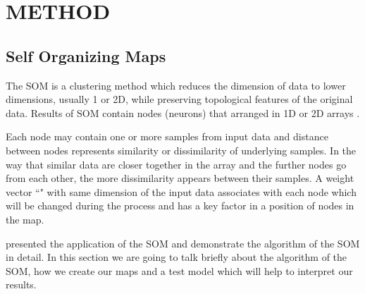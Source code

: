 
\section{METHOD}
\label{sec: method}
 \subsection{Self Organizing Maps}
 \label{sec: som}
 
 The SOM is a clustering method which reduces the dimension of data to lower dimensions, usually 1 or 2D, while preserving topological features of the original data.
 Results of SOM contain nodes (neurons) that arranged in 1D or 2D arrays \citep{Kohonen98}. 
 
 Each node may contain one or more samples from input data and distance between nodes represents similarity or dissimilarity of underlying samples. 
 In the way that similar data are closer together in the array and the further nodes go from each other, the more dissimilarity appears between their samples.
 A weight vector ``" with same dimension of the input data associates with each node which will be changed during the process and has a key factor in a position of nodes in the map.
 
 \cite{Geach12} presented the application of the SOM and demonstrate the algorithm of the SOM in detail. In this section we are going to talk briefly about the algorithm of the SOM, how we create our maps and a test model which will help to interpret our results. 
